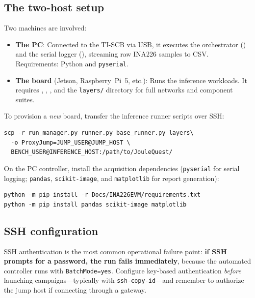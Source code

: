 \subsection{The two-host setup}

Two machines are involved:

\begin{itemize}
    \item \textbf{The PC}: Connected to the TI-SCB via USB, it executes the orchestrator () and the serial logger (), streaming raw INA226 samples to CSV. Requirements: Python and \texttt{pyserial}.
    \item \textbf{The board} (Jetson, Raspberry~Pi~5, etc.): Runs the inference workloads. It requires , , , and the \texttt{layers/} directory for full networks and component suites.
\end{itemize}

To provision a \emph{new} board, transfer the inference runner scripts over SSH:

\begin{lstlisting}
scp -r run_manager.py runner.py base_runner.py layers\
  -o ProxyJump=JUMP_USER@JUMP_HOST \
  BENCH_USER@INFERENCE_HOST:/path/to/JouleQuest/
\end{lstlisting}

On the PC controller, install the acquisition dependencies (\texttt{pyserial} for serial logging; \texttt{pandas}, \texttt{scikit-image}, and \texttt{matplotlib} for report generation):

\begin{lstlisting}
python -m pip install -r Docs/INA226EVM/requirements.txt
python -m pip install pandas scikit-image matplotlib
\end{lstlisting}

\subsection{SSH configuration}

SSH authentication is the most common operational failure point: \textbf{if SSH prompts for a password, the run fails immediately}, because the automated controller runs with \texttt{BatchMode=yes}. Configure key-based authentication \emph{before} launching campaigns---typically with \texttt{ssh-copy-id}---and remember to authorize the jump host if connecting through a gateway.

